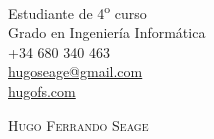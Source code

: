 \documentclass[a4paper, 11pt]{article}
\begin{document}
    \pagestyle{empty} %

    \begin{flushright}
        Estudiante de 4\textsuperscript{o} curso\\
        Grado en Ingeniería Informática\\
        +34 680 340 463\\
        \href{mailto: hugoseage@gmail.com}{hugoseage@gmail.com}\\
        \href{https://hugofs.com}{hugofs.com}\\
    \end{flushright}

    \vspace{-40mm}

    \begin{figure}[ht!]
        \begin{flushleft}
        \end{flushleft}
    \end{figure}

    {\textsc {\Huge \vspace{5mm} \hspace{-13mm} Hugo Ferrando Seage}}\\
\end{document}
